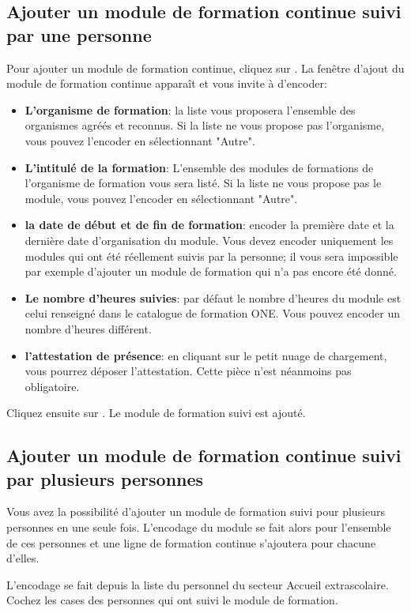 \subsection{Ajouter un module de formation continue suivi par une personne}
Pour ajouter un module de formation continue, cliquez sur . La fenêtre d'ajout du module de formation continue apparaît et vous invite à d'encoder:
\begin{itemize}
    \item \textbf{L'organisme de formation}: la liste vous proposera l'ensemble des organismes agréés et reconnus. Si la liste ne vous propose pas l'organisme, vous pouvez l'encoder en sélectionnant "Autre". 
    \item \textbf{L'intitulé de la formation}: L'ensemble des modules de formations de l'organisme de formation vous sera listé. Si la liste ne vous propose pas le module, vous pouvez l'encoder en sélectionnant "Autre". 
    \item \textbf{la date de début et de fin de formation}: encoder la première date et la dernière date d'organisation du module. Vous devez encoder uniquement les modules qui ont été réellement suivis par la personne; il vous sera impossible par exemple d'ajouter un module de formation qui n'a pas encore été donné.
    \item \textbf{Le nombre d'heures suivies}: par défaut le nombre d'heures du module est celui renseigné dans le catalogue de formation ONE. Vous pouvez encoder un nombre d'heures différent. 
    \item \textbf{l'attestation de présence}: en cliquant sur le petit nuage de chargement, vous pourrez déposer l'attestation. Cette pièce n'est néanmoins pas obligatoire. 
\end{itemize}

Cliquez ensuite sur .
Le module de formation suivi est ajouté. 


\subsection{Ajouter un module de formation continue suivi par plusieurs personnes}
Vous avez la possibilité d'ajouter un module de formation suivi pour plusieurs personnes en une seule fois. L'encodage du module se fait alors pour l'ensemble de ces personnes et une ligne de formation continue s'ajoutera pour chacune d'elles.

L'encodage se fait depuis la liste du personnel du secteur Accueil extrascolaire. Cochez les cases des personnes qui ont suivi le module de formation. 

